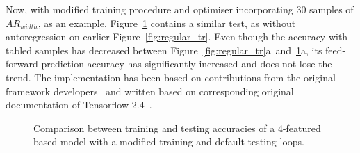 %
%
Now, with modified training procedure and optimiser incorporating 30 samples of $AR_{width}$, as an example, \mbox{Figure~\ref{fig:modefied_tr}} contains a similar test, as without autoregression on earlier Figure~\ref{fig:regular_tr}.
Even though the accuracy with tabled samples has decreased between \mbox{Figure~\ref{fig:regular_tr}a and~\ref{fig:modefied_tr}a}, its feed-forward prediction accuracy has significantly increased and does not lose the trend.
The implementation has been based on contributions from the original framework developers~\cite{time_2020} and written based on corresponding original documentation of Tensorflow 2.4~\cite{tensorflow2015-whitepaper}.
 {
\begin{figure}[!t]
    \centering
    \label{subfig:modefied_tr}
    \label{subfig:modefied_ts}
    \caption{Comparison between training and testing accuracies of a 4-featured based model with a modified training and default testing loops.}
    \label{fig:modefied_tr}
\end{figure}
}
